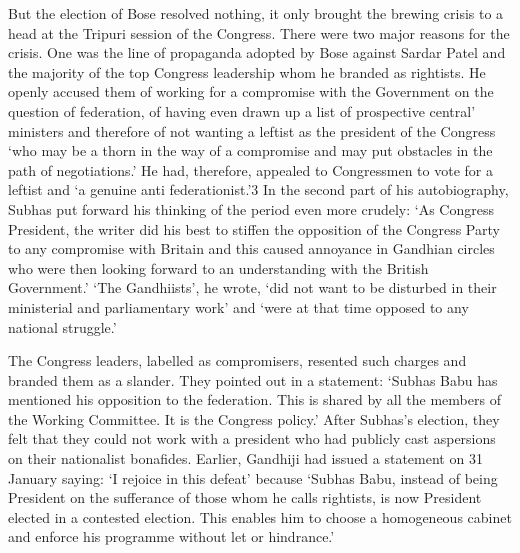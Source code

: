 But the election of Bose resolved nothing, it only brought the brewing crisis to a head at the Tripuri session of the Congress. There were two major reasons for the crisis. One was the line of propaganda adopted by Bose against Sardar Patel and the majority of the top Congress leadership whom he branded as rightists. He openly accused them of working for a compromise with the Government on the question of federation, of having even drawn up a list of prospective central' ministers and therefore of not wanting a leftist as the president of the Congress `who may be a thorn in the way of a compromise and may put obstacles in the path of negotiations.' He had, therefore, appealed to Congressmen to vote for a leftist and `a genuine anti­ federationist.'3 In the second part of his autobiography, Subhas put forward his thinking of the period even more crudely: `As Congress President, the writer did his best to stiffen the opposition of the Congress Party to any compromise with Britain and this caused annoyance in Gandhian circles who were then looking forward to an understanding with the British Government.' `The Gandhiists', he wrote, `did not want to be disturbed in their ministerial and parliamentary work' and `were at that time opposed to any national struggle.' 

The Congress leaders, labelled as compromisers, resented such charges and branded them as a slander. They pointed out in a statement: `Subhas Babu has mentioned his opposition to the federation. This is shared by all the members of the Working Committee. It is the Congress policy.' After Subhas's election, they felt that they could not work with a president who had publicly cast aspersions on their nationalist bonafides. Earlier, Gandhiji had issued a statement on 31 January saying: `I rejoice in this defeat' because `Subhas Babu, instead of being President on the sufferance of those whom he calls rightists, is now President elected in a contested election. This enables him to choose a homogeneous cabinet and enforce his programme without let or hindrance.' 

